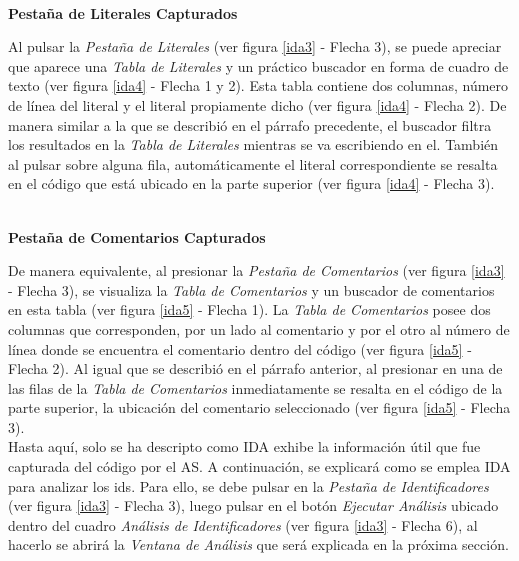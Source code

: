 \noindent \textbf{\\Pestaña de Literales Capturados\\} 

Al pulsar la \textit{Pestaña de Literales} (ver figura \ref{ida3} - Flecha 3), se puede apreciar que aparece una \textit{Tabla de Literales} y un práctico buscador en forma de cuadro de texto (ver figura \ref{ida4} - Flecha 1 y 2). Esta tabla contiene dos columnas, número de línea del literal y el literal propiamente dicho (ver figura \ref{ida4} - Flecha 2).
De manera similar a la que se describió en el párrafo precedente, el buscador filtra los resultados en la \textit{Tabla de Literales} mientras se va escribiendo en el. También al pulsar sobre alguna fila, automáticamente el literal correspondiente se resalta en el código que está ubicado en la parte superior (ver figura \ref{ida4} - Flecha 3).

\noindent \textbf{\\Pestaña de Comentarios Capturados\\} 

De manera equivalente, al presionar la \textit{Pestaña de Comentarios} (ver figura \ref{ida3} - Flecha 3), se visualiza la \textit{Tabla de Comentarios} y un buscador de comentarios en esta tabla (ver figura \ref{ida5} - Flecha 1). La \textit{Tabla de Comentarios} posee dos columnas que corresponden, por un lado al comentario y por el otro al número de línea donde se encuentra el comentario dentro del código (ver figura \ref{ida5} - Flecha 2). Al igual que se describió en el párrafo anterior, al presionar en una de las filas de la \textit{Tabla de Comentarios} inmediatamente se resalta en el código de la parte superior, la ubicación del comentario seleccionado (ver figura \ref{ida5} - Flecha 3).\\

Hasta aquí, solo se ha descripto como IDA exhibe la información útil que fue capturada del código por el AS. A continuación, se explicará como se emplea IDA para analizar los ids. Para ello, se debe pulsar en la \textit{Pestaña de Identificadores} (ver figura \ref{ida3} - Flecha 3), luego pulsar en el botón \textit{Ejecutar Análisis} ubicado dentro del cuadro \textit{Análisis de Identificadores} (ver figura \ref{ida3} - Flecha 6), al hacerlo se abrirá la \textit{Ventana de Análisis} que será explicada en la próxima sección.

